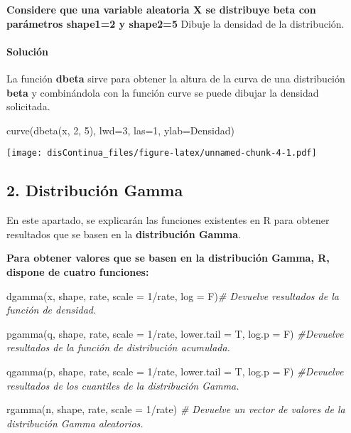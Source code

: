 \documentclass[
]{article}
\newenvironment{Shaded}{\begin{snugshade}}{\end{snugshade}}
\newcommand{\AttributeTok}[1]{\textcolor[rgb]{0.77,0.63,0.00}{#1}}
\newcommand{\CommentTok}[1]{\textcolor[rgb]{0.56,0.35,0.01}{\textit{#1}}}
\newcommand{\DecValTok}[1]{\textcolor[rgb]{0.00,0.00,0.81}{#1}}
\newcommand{\FunctionTok}[1]{\textcolor[rgb]{0.00,0.00,0.00}{#1}}
\newcommand{\NormalTok}[1]{#1}
\newcommand{\SpecialCharTok}[1]{\textcolor[rgb]{0.00,0.00,0.00}{#1}}
\newcommand{\StringTok}[1]{\textcolor[rgb]{0.31,0.60,0.02}{#1}}
\begin{document}
\textbf{Considere que una variable aleatoria X se distribuye beta con
parámetros shape1=2 y shape2=5} Dibuje la densidad de la distribución.

\hypertarget{soluciuxf3n}{%
\paragraph{Solución}\label{soluciuxf3n}}

La función \textbf{dbeta} sirve para obtener la altura de la curva de
una distribución \textbf{beta} y combinándola con la función curve se
puede dibujar la densidad solicitada.

\begin{Shaded}
\begin{Highlighting}[]
\FunctionTok{curve}\NormalTok{(}\FunctionTok{dbeta}\NormalTok{(x, }\DecValTok{2}\NormalTok{, }\DecValTok{5}\NormalTok{), }\AttributeTok{lwd=}\DecValTok{3}\NormalTok{, }\AttributeTok{las=}\DecValTok{1}\NormalTok{, }\AttributeTok{ylab=}\StringTok{\textquotesingle{}Densidad\textquotesingle{}}\NormalTok{)}
\end{Highlighting}
\end{Shaded}

\texttt{[image: disContinua\_files/figure-latex/unnamed-chunk-4-1.pdf]}

\hypertarget{distribuciuxf3n-gamma}{%
\subsection{2. Distribución Gamma}\label{distribuciuxf3n-gamma}}

En este apartado, se explicarán las funciones existentes en R para
obtener resultados que se basen en la \textbf{distribución Gamma}.

\textbf{Para obtener valores que se basen en la distribución Gamma, R,
dispone de cuatro funciones:}

\begin{Shaded}
\begin{Highlighting}[]
\FunctionTok{dgamma}\NormalTok{(x, shape, rate, }\AttributeTok{scale =} \DecValTok{1}\SpecialCharTok{/}\NormalTok{rate, }\AttributeTok{log =}\NormalTok{ F)}\CommentTok{\#    Devuelve resultados de la función de densidad.}

\FunctionTok{pgamma}\NormalTok{(q, shape, rate, }\AttributeTok{scale =} \DecValTok{1}\SpecialCharTok{/}\NormalTok{rate, }\AttributeTok{lower.tail =}\NormalTok{ T, }\AttributeTok{log.p =}\NormalTok{ F)   }\CommentTok{\#Devuelve resultados de la función de distribución acumulada.}

\FunctionTok{qgamma}\NormalTok{(p, shape, rate, }\AttributeTok{scale =} \DecValTok{1}\SpecialCharTok{/}\NormalTok{rate, }\AttributeTok{lower.tail =}\NormalTok{ T, }\AttributeTok{log.p =}\NormalTok{ F)   }\CommentTok{\#Devuelve resultados de los cuantiles de la distribución Gamma.}

\FunctionTok{rgamma}\NormalTok{(n, shape, rate, }\AttributeTok{scale =} \DecValTok{1}\SpecialCharTok{/}\NormalTok{rate) }\CommentTok{\#    Devuelve un vector de valores de la distribución Gamma aleatorios.}
\end{Highlighting}
\end{Shaded}
\end{document}
